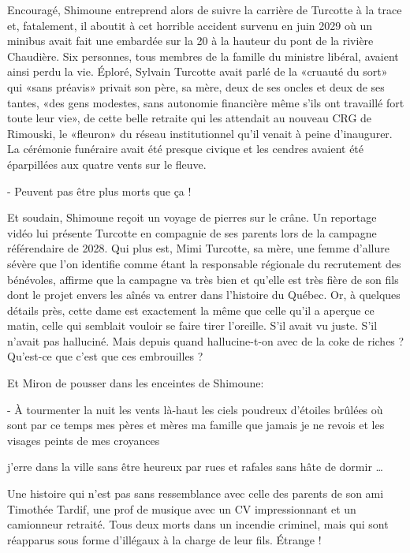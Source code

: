 Encouragé, Shimoune entreprend alors de suivre la carrière de Turcotte à la trace et, fatalement, il aboutit à cet horrible accident survenu en juin 2029 où un minibus avait fait une embardée sur la 20 à la hauteur du pont de la rivière Chaudière. Six personnes, tous membres de la famille du ministre libéral, avaient ainsi perdu la vie. Éploré, Sylvain Turcotte avait parlé de la «cruauté du sort» qui «sans préavis» privait son père, sa mère, deux de ses oncles et deux de ses tantes, «des gens modestes, sans autonomie financière même s’ils ont travaillé fort toute leur vie», de cette belle retraite qui les attendait au nouveau CRG de Rimouski, le «fleuron» du réseau institutionnel qu’il venait à peine d’inaugurer. La cérémonie funéraire avait été presque civique et les cendres avaient été éparpillées aux quatre vents sur le fleuve.

- Peuvent pas être plus morts que ça !

Et soudain, Shimoune reçoit un voyage de pierres sur le crâne. Un reportage vidéo lui présente Turcotte en compagnie de ses parents lors de la campagne référendaire de 2028. Qui plus est, Mimi Turcotte, sa mère, une femme d’allure sévère que l’on identifie comme étant la responsable régionale du recrutement des bénévoles, affirme que la campagne va très bien et qu’elle est très fière de son fils dont le projet envers les aînés va entrer dans l’histoire du Québec. Or, à quelques détails près, cette dame est exactement la même que celle qu’il a aperçue ce matin, celle qui semblait vouloir se faire tirer l’oreille. S’il avait vu juste. S’il n’avait pas halluciné. Mais depuis quand hallucine-t-on avec de la coke de riches ? Qu’est-ce que c’est que ces embrouilles ?

Et Miron de pousser dans les enceintes de Shimoune:

    - À tourmenter la nuit les vents là-haut
    les ciels poudreux d’étoiles brûlées
    où sont par ce temps mes pères et mères
    ma famille que jamais je ne revois
    et les visages peints de mes croyances

    j’erre dans la ville sans être heureux
    par rues et rafales sans hâte de dormir …

Une histoire qui n’est pas sans ressemblance avec celle des parents de son ami Timothée Tardif, une prof de musique avec un CV impressionnant et un camionneur retraité. Tous deux morts dans un incendie criminel, mais qui sont réapparus sous forme d’illégaux à la charge de leur fils. Étrange !

